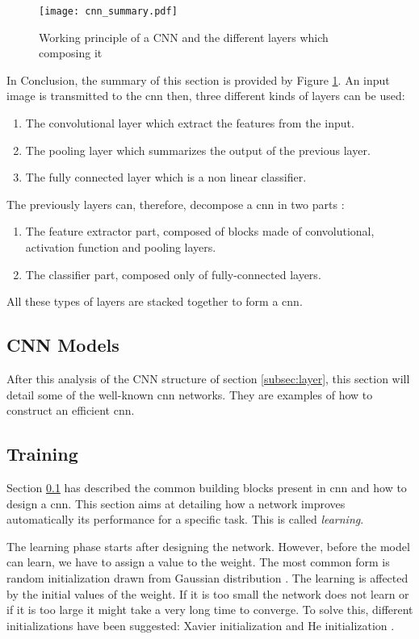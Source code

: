 \begin{figure}
    \centering
    \texttt{[image: cnn\_summary.pdf]}
    \caption{Working principle of a CNN and the different layers which composing it}
    \label{fig:layer:summary}
\end{figure}
%
In Conclusion, the summary of this section is provided by Figure \ref{fig:layer:summary}. An input image is transmitted to the \acrshort{cnn} then, three different kinds of layers can be used:
%
\begin{enumerate}
    \item The convolutional layer which extract the features from the input.
    \item The pooling layer which summarizes the output of the previous layer.
    \item The fully connected layer which is a non linear classifier.
\end{enumerate}
%
The previously layers can, therefore, decompose a \acrshort{cnn} in two parts \cite{matteucci_artificial_2019}:
\begin{enumerate}
    \item The feature extractor part, composed of blocks made of convolutional, activation function and pooling layers.
    \item The classifier part, composed only of fully-connected layers.
\end{enumerate}
%
All these types of layers are stacked together to form a \acrshort{cnn}.
%
\subsection{CNN Models} \label{subsec:models}
After this analysis of the CNN structure of section \ref{subsec:layer}, this section will detail some of the well-known \acrshort{cnn} networks. They are examples of how to construct an efficient \acrshort{cnn}.

%

%
%
\subsection{Training} \label{subsec:train}
Section \ref{subsec:models} has described the common building blocks present in \acrshort{cnn} and how to design a \acrshort{cnn}. This section aims at detailing how a network improves automatically its performance for a specific task. This is called \textit{learning}.

The learning phase starts after designing the network. However, before the model can learn, we have to assign a value to the weight. The most common form is random initialization drawn from Gaussian distribution \cite{he_delving_2015}. The learning is affected by the initial values of the weight. If it is too small the network does not learn or if it is too large it might take a very long time to converge. To solve this, different initializations have been suggested: Xavier initialization \cite{glorot_understanding_2010} and He initialization \cite{he_delving_2015}.

